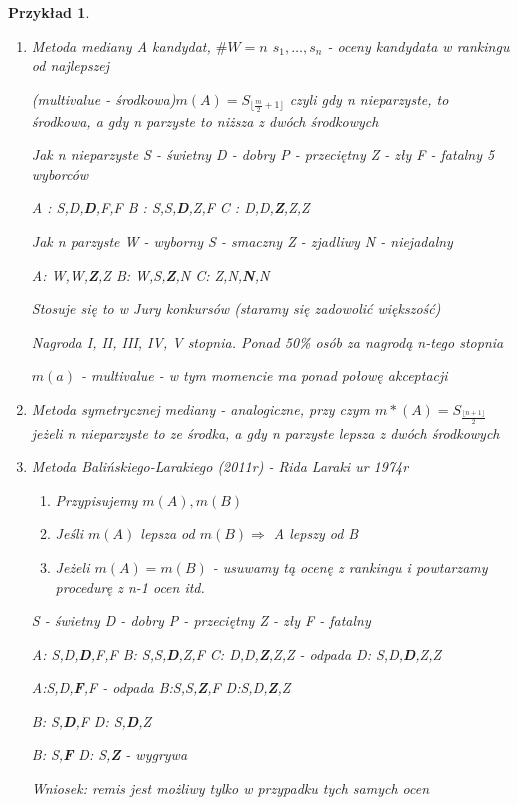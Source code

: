 \documentclass[12pt,a4paper]{article}
\theoremstyle{break}
\newtheorem{example}{Przykład}[section]
\begin{document}
	\begin{example}
		\begin{enumerate}[1.]
			\item Metoda mediany
			A kandydat, $\# W = n$
			$s_1,\dots,s_n$ - oceny kandydata w rankingu od najlepszej
			
			(multivalue - środkowa)$m(A)=S_{\lfloor \frac{m}{2}+1\rfloor}$ czyli gdy n nieparzyste, to środkowa, a gdy n parzyste to niższa z dwóch środkowych
			
			Jak n nieparzyste
			S - świetny
			D - dobry
			P - przeciętny
			Z - zły
			F - fatalny
			5 wyborców
			
			A : S,D,\textbf{D},F,F
			B : S,S,\textbf{D},Z,F
			C : D,D,\textbf{Z},Z,Z
			
			Jak n parzyste
			W - wyborny
			S - smaczny
			Z - zjadliwy
			N - niejadalny
			
			A: W,W,\textbf{Z},Z
			B: W,S,\textbf{Z},N
			C: Z,N,\textbf{N},N
			
			Stosuje się to w Jury konkursów (staramy się zadowolić większość)
			
			Nagroda I, II, III, IV, V stopnia.
			Ponad 50\% osób za nagrodą n-tego stopnia
			
			$m(a)$ - multivalue - w tym momencie ma ponad połowę akceptacji
			
			\item Metoda symetrycznej mediany - analogiczne, przy czym $m*(A)=S_{\frac{\lfloor n+1\rfloor}{2}}$ jeżeli n nieparzyste to ze środka, a gdy n parzyste lepsza z dwóch środkowych
			
			\item Metoda Balińskiego-Larakiego (2011r) - Rida Laraki ur 1974r
			
			\begin{enumerate}[1.]
				\item Przypisujemy $m(A),m(B)$
				\item Jeśli $m(A)$ lepsza od $m(B) \Rightarrow$ A lepszy od B
				\item Jeżeli $m(A)=m(B)$ - usuwamy tą ocenę z rankingu i powtarzamy procedurę z n-1 ocen itd.
			\end{enumerate}
			
			S - świetny
			D - dobry
			P - przeciętny
			Z - zły
			F - fatalny
			
			A: S,D,\textbf{D},F,F
			B: S,S,\textbf{D},Z,F
			C: D,D,\textbf{Z},Z,Z - odpada
			D: S,D,\textbf{D},Z,Z
			
			A:S,D,\textbf{F},F - odpada
			B:S,S,\textbf{Z},F
			D:S,D,\textbf{Z},Z
			
			B: S,\textbf{D},F
			D: S,\textbf{D},Z
			
			B: S,\textbf{F}
			D: S,\textbf{Z} - wygrywa
			
			Wniosek: remis jest możliwy tylko w przypadku tych samych ocen
			
		\end{enumerate}
	\end{example}
	
\end{document}
